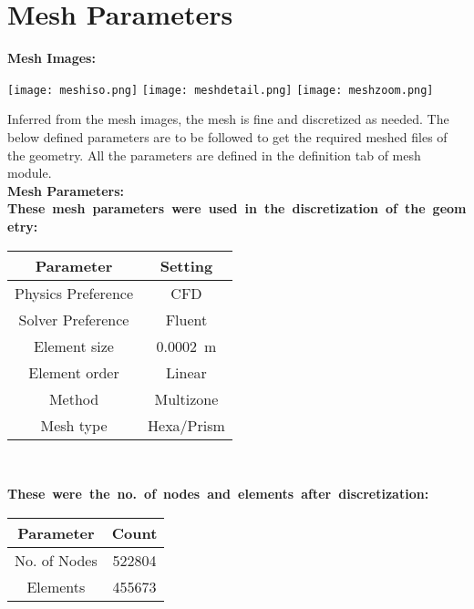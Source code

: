 \documentclass{article}
\begin{document}
\section{Mesh Parameters}
\textbf{Mesh Images: }\\
\vspace{1.5cm}
\begin{center}
    \texttt{[image: meshiso.png]}
    \vspace{2cm}
    \texttt{[image: meshdetail.png]}
    \texttt{[image: meshzoom.png]}
\end{center}
\vspace{1cm}
Inferred from the mesh images, the mesh is fine and discretized as needed. The below defined parameters are to be followed to get the required meshed files of the geometry. All the parameters are defined in the definition tab of mesh module. 
\vspace{1cm}\\
\textbf{Mesh Parameters: }
\vspace{1cm}\\
\textbf{These\ mesh\ parameters\ were\ used\ in\ the\ discretization\ of\ the\ geometry:}
\vspace{0.25cm}
\begin{center}
\begin{tabular}{c  c}
\hline
    \textbf{Parameter} & \textbf{Setting} \\
    \hline
    Physics Preference & CFD\\
    Solver Preference & Fluent\\
    Element size & \SI{0.0002}{\meter}\\
    Element order & Linear\\
    Method & Multizone\\
    Mesh type & Hexa/Prism\\
    \hline
\end{tabular}\\
\end{center}
\vspace{1cm}
\textbf{These\ were\ the\ no.\ of\ nodes\ and\ elements\ after\ discretization:}   
\vspace{0.25cm}
\begin{center}
\begin{tabular}{c  c}
\hline
    \textbf{Parameter} & \textbf{Count} \\
    \hline
    No. of Nodes & 522804\\
    Elements & 455673\\
    \hline
\end{tabular}
\end{center}   
\vspace{1cm}
\newpage
\end{document}
